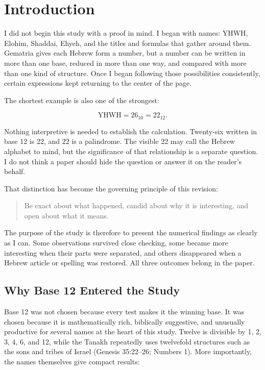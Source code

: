 \section{Introduction}

I did not begin this study with a proof in mind. I began with names: YHWH, Elohim, Shaddai, Ehyeh, and the titles and formulas that gather around them. Gematria gives each Hebrew form a number, but a number can be written in more than one base, reduced in more than one way, and compared with more than one kind of structure. Once I began following those possibilities consistently, certain expressions kept returning to the center of the page.

The shortest example is also one of the strongest:

\[
\text{YHWH}=26_{10}=22_{12}.
\]

Nothing interpretive is needed to establish the calculation. Twenty-six written in base 12 is 22, and 22 is a palindrome. The visible 22 may call the Hebrew alphabet to mind, but the significance of that relationship is a separate question. I do not think a paper should hide the question or answer it on the reader's behalf.

That distinction has become the governing principle of this revision:

\begin{quote}
Be exact about what happened, candid about why it is interesting, and open about what it means.
\end{quote}

The purpose of the study is therefore to present the numerical findings as clearly as I can. Some observations survived close checking, some became more interesting when their parts were separated, and others disappeared when a Hebrew article or spelling was restored. All three outcomes belong in the paper.

\subsection{Why Base 12 Entered the Study}

Base 12 was not chosen because every test makes it the winning base. It was chosen because it is mathematically rich, biblically suggestive, and unusually productive for several names at the heart of this study. Twelve is divisible by 1, 2, 3, 4, 6, and 12, while the Tanakh repeatedly uses twelvefold structures such as the sons and tribes of Israel (Genesis 35:22--26; Numbers 1).\cite{oshb} More importantly, the names themselves give compact results:

